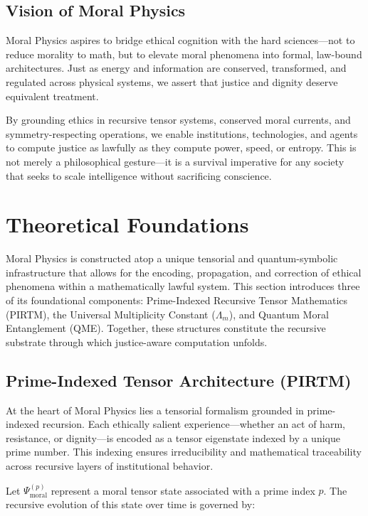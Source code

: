 \documentclass[12]{amsart}
\theoremstyle{plain}
\begin{document}
\subsection{Vision of Moral Physics}

Moral Physics aspires to bridge ethical cognition with the hard sciences—not to reduce morality to math, but to elevate moral phenomena into formal, law-bound architectures. Just as energy and information are conserved, transformed, and regulated across physical systems, we assert that justice and dignity deserve equivalent treatment.

By grounding ethics in recursive tensor systems, conserved moral currents, and symmetry-respecting operations, we enable institutions, technologies, and agents to compute justice as lawfully as they compute power, speed, or entropy. This is not merely a philosophical gesture—it is a survival imperative for any society that seeks to scale intelligence without sacrificing conscience.

\section{Theoretical Foundations}

Moral Physics is constructed atop a unique tensorial and quantum-symbolic infrastructure that allows for the encoding, propagation, and correction of ethical phenomena within a mathematically lawful system. This section introduces three of its foundational components: Prime-Indexed Recursive Tensor Mathematics (PIRTM), the Universal Multiplicity Constant (\(\Lambda_m\)), and Quantum Moral Entanglement (QME). Together, these structures constitute the recursive substrate through which justice-aware computation unfolds.

\subsection{Prime-Indexed Tensor Architecture (PIRTM)}

At the heart of Moral Physics lies a tensorial formalism grounded in prime-indexed recursion. Each ethically salient experience—whether an act of harm, resistance, or dignity—is encoded as a tensor eigenstate indexed by a unique prime number. This indexing ensures irreducibility and mathematical traceability across recursive layers of institutional behavior.

Let \(\Psi_{\text{moral}}^{(p)}\) represent a moral tensor state associated with a prime index \(p\). The recursive evolution of this state over time is governed by:
\end{document}
